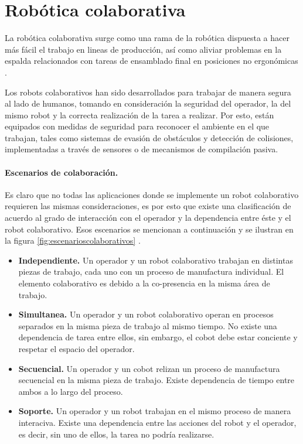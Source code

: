 \section{Robótica colaborativa}

La robótica colaborativa surge como una rama de la robótica dispuesta a hacer más fácil el trabajo en lineas de producción, así como aliviar problemas en la espalda relacionados con tareas de ensamblado final en posiciones no ergonómicas \cite{cobot2018}\cite{cobotreview}.

Los robots colaborativos han sido desarrollados para trabajar de manera segura al lado de humanos, tomando en consideración la seguridad del operador, la del mismo robot y la correcta realización de la tarea a realizar.  Por esto, están equipados con medidas de seguridad para reconocer el ambiente en el que trabajan, tales como sistemas de evasión de obstáculos y detección de colisiones, implementadas a través de sensores o de mecanismos de compilación pasiva.

\paragraph{Escenarios de colaboración.} Es claro que no todas las aplicaciones donde se implemente un robot colaborativo requieren las mismas consideraciones, es por esto que existe una clasificación de acuerdo al grado de interacción con el operador y la dependencia entre éste y el robot colaborativo. Esos escenarios se mencionan a continuación y se ilustran en la figura \ref{fig:escenarioscolaborativos} \cite{Zaatari2019}.


\begin{itemize}
\itemsep0em
\item \textbf{Independiente.} Un operador y un robot colaborativo trabajan en distintas piezas de trabajo, cada uno con un proceso de manufactura individual. El elemento colaborativo es debido a la co-presencia en la misma área de trabajo.
\item \textbf{Simultanea.} Un operador y un robot colaborativo operan en procesos separados en la misma pieza de trabajo al mismo tiempo. No existe una dependencia de tarea entre ellos, sin embargo, el cobot debe estar conciente y respetar el espacio del operador.
\item \textbf{Secuencial.} Un operador y un cobot relizan un proceso de manufactura secuencial en la misma pieza de trabajo. Existe dependencia de tiempo entre ambos a lo largo del proceso.
\item \textbf{Soporte.} Un operador y un robot trabajan en el mismo proceso de manera interaciva. Existe una dependencia entre las acciones del robot y el operador, es decir, sin uno de ellos, la tarea no podría realizarse.
\end{itemize}

